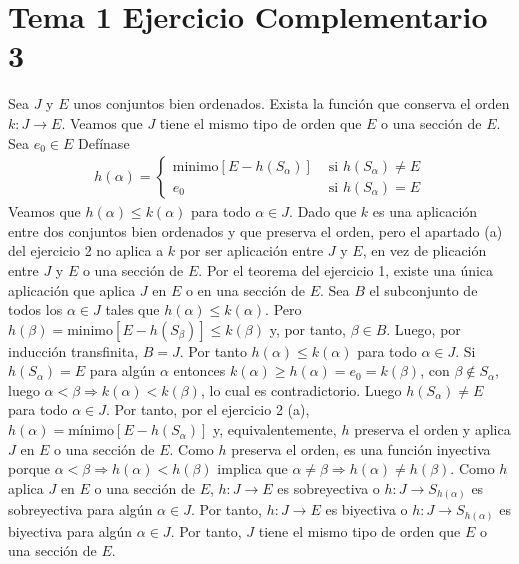 \documentclass{article}
\begin{document}
\section{Tema 1 Ejercicio Complementario 3}
Sea $J$ y $E$ unos conjuntos bien ordenados. Exista la función que conserva el orden $k:J\rightarrow  E$. Veamos que $J$ tiene el mismo tipo de orden que $E$ o una sección de $E$. Sea $e_0\in E$ 
Defínase 
\begin{eqnarray}
h(\alpha)=\begin{cases}
\text{minimo}[E-h(S_\alpha)] & \text{ si }h(S_\alpha)\neq E \nonumber\\
e_0 & \text{ si }h(S_\alpha)=E
\end{cases}
\end{eqnarray}
Veamos que $h(\alpha)\leq k(\alpha)$ para todo $ \alpha\in J$. Dado que $k$ es una aplicación entre dos conjuntos bien ordenados y que preserva el orden, pero el apartado (a) del ejercicio 2 no aplica a $k$ por ser aplicación entre $J$ y $E$, en vez de plicación entre $J$ y $E$ o una sección de $E$. Por el teorema del ejercicio 1, existe una única aplicación que aplica $J$ en $E$ o en una sección de $E$. Sea $B$ el subconjunto de todos los $\alpha\in J$ tales que $h(\alpha)\leq k(\alpha)$. Pero $h(\beta)=\text{minimo}[E-h(S_\beta)]\leq k(\beta)$ y, por tanto, $\beta\in B$. Luego, por inducción transfinita, $B=J$. Por tanto $h(\alpha)\leq k(\alpha)$ para todo $\alpha \in J$. Si $h(S_\alpha)=E$ para algún $\alpha$ entonces $k(\alpha)\geq h(\alpha)=e_0=k(\beta)$, con
$\beta\notin S_\alpha$, luego $\alpha<\beta\Rightarrow  k(\alpha)<k(\beta)$, lo cual es contradictorio. Luego $h(S_\alpha)\neq E$ para todo $\alpha \in J$. Por tanto, por el ejercicio 2 (a), $h(\alpha)= \text{mínimo}[E-h(S_\alpha)]$ y, equivalentemente, $h$ preserva el orden y aplica $J$ en $E$ o una sección de $E$. Como $h$ preserva el orden, es una función inyectiva porque $\alpha<\beta\Rightarrow h(\alpha)<h(\beta)$ implica que  $\alpha\neq \beta\Rightarrow h(\alpha)\neq h(\beta)$. Como $h$ aplica $J$ en $E$ o una sección de $E$, $h:J\rightarrow E$ es sobreyectiva o  $h:J\rightarrow S_{h(\alpha)}$ es sobreyectiva para algún $\alpha \in J$. Por tanto, $h:J\rightarrow E$ es biyectiva o  $h:J\rightarrow S_{h(\alpha)}$ es biyectiva para algún $\alpha \in J$. Por tanto, $J$ tiene el mismo tipo de orden que $E$ o una sección de $E$.
\end{document}

